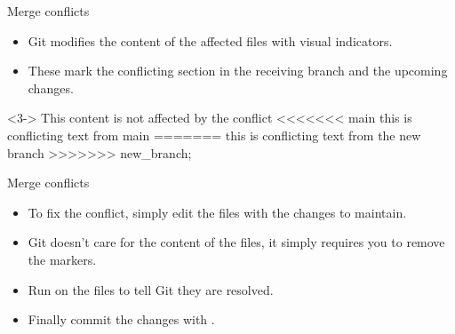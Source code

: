 \begin{frame}[fragile]{Merge conflicts \insertcontinuationtext}
    \begin{itemize}[<+->]
        \item Git modifies the content of the affected files with visual indicators.
        \item These mark the conflicting section in the receiving branch and the upcoming changes. 
    \end{itemize}
    \begin{codeblock}<3->
    This content is not affected by the conflict
    <<<<<<< main
    this is conflicting text from main
    =======
    this is conflicting text from the new branch
    >>>>>>> new_branch;
    \end{codeblock}
\end{frame}

\begin{frame}[fragile]{Merge conflicts \insertcontinuationtext}
    \begin{itemize}[<+->]
        \item To fix the conflict, simply edit the files with the changes to maintain.
        \item Git doesn't care for the content of the files, it simply requires you to remove the markers.
        \item Run  on the files to tell Git they are resolved.
        \item Finally commit the changes with .
    \end{itemize}
\end{frame}

